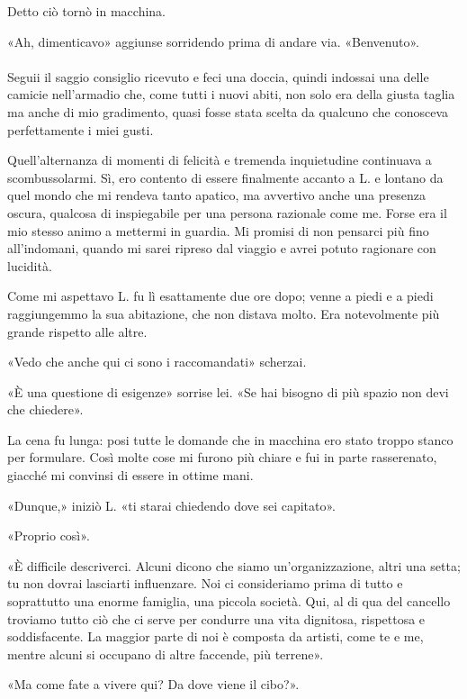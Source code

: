 \documentclass[a4paper,12pt]{book}
\begin{document}
Detto ciò tornò in macchina.

«Ah, dimenticavo» aggiunse sorridendo prima di andare via. «Benvenuto».

\paragraph{}
Seguii il saggio consiglio ricevuto e feci una doccia, quindi indossai una delle
camicie nell'armadio che, come tutti i nuovi abiti, non solo era della giusta
taglia ma anche di mio gradimento, quasi fosse stata scelta da qualcuno che
conosceva perfettamente i miei gusti.

Quell'alternanza di momenti di felicità e tremenda inquietudine continuava a
scombussolarmi. Sì, ero contento di essere finalmente accanto a L. e lontano da
quel mondo che mi rendeva tanto apatico, ma avvertivo anche una presenza oscura,
qualcosa di inspiegabile per una persona razionale come me. Forse era il mio
stesso animo a mettermi in guardia. Mi promisi di non pensarci più fino
all'indomani, quando mi sarei ripreso dal viaggio e avrei potuto ragionare con
lucidità.

Come mi aspettavo L. fu lì esattamente due ore dopo; venne a piedi e a piedi
raggiungemmo la sua abitazione, che non distava molto. Era notevolmente più
grande rispetto alle altre.

«Vedo che anche qui ci sono i raccomandati» scherzai.

«È una questione di esigenze» sorrise lei. «Se hai bisogno di più spazio non
devi che chiedere».

La cena fu lunga: posi tutte le domande che in macchina ero stato troppo stanco
per formulare. Così molte cose mi furono più chiare e fui in parte rasserenato,
giacché mi convinsi di essere in ottime mani.

«Dunque,» iniziò L. «ti starai chiedendo dove sei capitato».

«Proprio così».

«È difficile descriverci. Alcuni dicono che siamo un'organizzazione, altri una
setta; tu non dovrai lasciarti influenzare. Noi ci consideriamo prima di tutto
e soprattutto una enorme famiglia, una piccola società. Qui, al di qua del
cancello troviamo tutto ciò che ci serve per condurre una vita dignitosa,
rispettosa e soddisfacente. La maggior parte di noi è composta da artisti, come
te e me, mentre alcuni si occupano di altre faccende, più terrene».

«Ma come fate a vivere qui? Da dove viene il cibo?».
\end{document}

